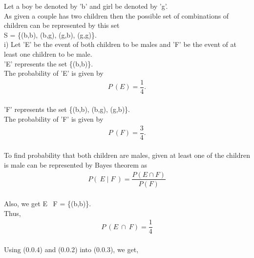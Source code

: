 \documentclass[journal,12pt,twocolumn]{IEEEtran}
\begin{document}
\subsection*{}\\

Let a boy be denoted by 'b' and girl be denoted by 'g'.\\

As given a couple has two children then the possible set of combinations of children can be represented by this set\\ S = \{(b,b), (b,g), (g,b), (g,g)\}.\\


i)    Let 'E' be the event of both children to be males and 'F' be the event of at least one children to be male.\\
    
    'E' represents the set \{(b,b)\}.\\
    
    The probability of 'E' is given by \begin{align}P\ (E) = \dfrac {1}{4}.\end{align}\\
    
    'F' represents the set \{(b,b), (b,g), (g,b)\}.\\
    
    The probability of 'F' is given by \begin{align} P\ (F) = \dfrac {3}{4}.\end{align}\\
    
    To find probability that both children are males, given at least one of the
    children is male can be represented by Bayes theorem as\\
    
    \begin{align} P (\ E\;|\;F\ ) = \dfrac{P (E \cap F)}{P (F)}\end{align}\\
    
    Also, we get E \cap\ F = \{(b,b)\}.\\
    
    \hspace{25} Thus, \begin{align}P\ (E\ \cap\ F) = \dfrac{1}{4}\end{align}\\
    
    \hspace{25}
    \hspace{3}Using (0.0.4) and (0.0.2) into (0.0.3), we get,\\
    
\end{document}
